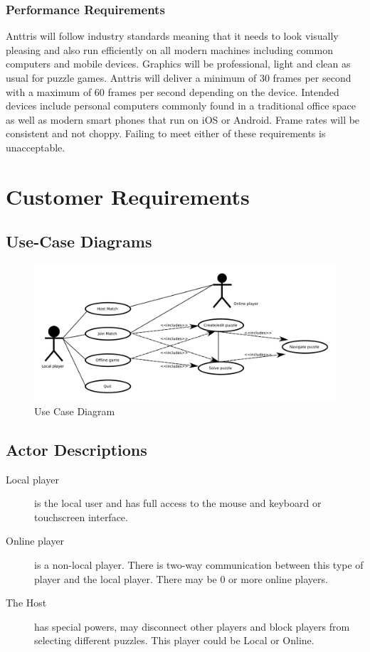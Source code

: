 \documentclass[12pt]{article}
\begin{document}
\subsubsection{Performance Requirements}
Anttris will follow industry standards meaning that it needs to look visually pleasing and also run efficiently on all modern machines including common computers and mobile devices. Graphics will be professional, light and clean as usual for puzzle games. Anttris will deliver a minimum of 30 frames per second with a maximum of 60 frames per second depending on the device. Intended devices include personal computers commonly found in a traditional office space as well as modern smart phones that run on iOS or Android. Frame rates will be consistent and not choppy. Failing to meet either of these requirements is unacceptable.

\section{Customer Requirements}
\subsection{Use-Case Diagrams}
    \begin{figure}[H]
        \centering
        \includegraphics[width=6in]{use_cases.png}
        \caption{Use Case Diagram}
    \end{figure}

\subsection{Actor Descriptions}
    \begin{description}
        \item[Local player] is the local user and has full
            access to the mouse and keyboard or touchscreen interface.
        \item[Online player] is a non-local player. There is two-way
            communication between this type of player and the local player.
            There may be 0 or more online players.
        \item[The Host] has special powers, may disconnect other players and
            block players from selecting different puzzles. This player could
            be Local or Online.
    \end{description}
\end{document}
